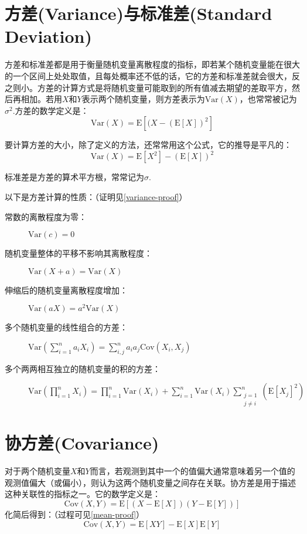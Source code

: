 \documentclass[UTF8]{ctexbook}
\begin{document}
\section{方差(Variance)与标准差(Standard Deviation)}
\label{var-sd}
方差和标准差都是用于衡量随机变量离散程度的指标，即若某个随机变量能在很大的一个区间上处处取值，且每处概率还不低的话，它的方差和标准差就会很大，反之则小。方差的计算方式是将随机变量可能取到的所有值减去期望的差取平方，然后再相加。若用$X$和$Y$表示两个随机变量，则方差表示为$\mathrm{Var}(X)$，也常常被记为$\sigma^2$.方差的数学定义是：
\[
	\mathrm{Var}(X)=\mathrm E[(X-(\mathrm E[X])^2]
\]

要计算方差的大小，除了定义的方法，还常常用这个公式，它的推导是平凡的：
\[
    \mathrm{Var}(X)=\mathrm E[X^2]-\left(\mathrm{E}[X]\right)^2
\]

标准差是方差的算术平方根，常常记为$\sigma$.

以下是方差计算的性质：（证明见\ref{variance-proof}）
\begin{description}
	\item [常数的离散程度为零：]
	$\mathrm{Var}(c)=0$
	\item [随机变量整体的平移不影响其离散程度：]
	$\mathrm{Var}(X+a)=\mathrm{Var}(X)$
	\item [伸缩后的随机变量离散程度增加：]
	$\mathrm{Var}(aX)=a^2\mathrm{Var}(X)$
	\item [多个随机变量的线性组合的方差：]
	$\mathrm{Var}\left(\sum_{i=1}^na_iX_i\right)=\sum_{i,j}^na_ia_j\mathrm{Cov}(X_i,X_j)$
	\item [多个两两相互独立的随机变量的积的方差：]
	$\mathrm{Var}\left(\prod_{i=1}^nX_i\right)=\prod_{i=1}^n\mathrm{Var}(X_i)+\sum_{i=1}^n\mathrm{Var}(X_i)\sum_{\substack{j=1\\ j\neq i}}^n(\mathrm E[X_j]^2)$
\end{description}
\section{协方差(Covariance)}
\label{covariance}
对于两个随机变量$X$和$Y$而言，若观测到其中一个的值偏大通常意味着另一个值的观测值偏大（或偏小），则认为这两个随机变量之间存在关联。协方差是用于描述这种关联性的指标之一。它的数学定义是：
\[
	\mathrm{Cov}(X,Y)=\mathrm E[(X-\mathrm E[X])(Y-\mathrm E[Y])]
\]
化简后得到：（过程可见\ref{mean-proof}）
\[
	\mathrm{Cov}(X,Y)=\mathrm E[XY]-\mathrm E[X]\mathrm E[Y]
\]
\end{document}
